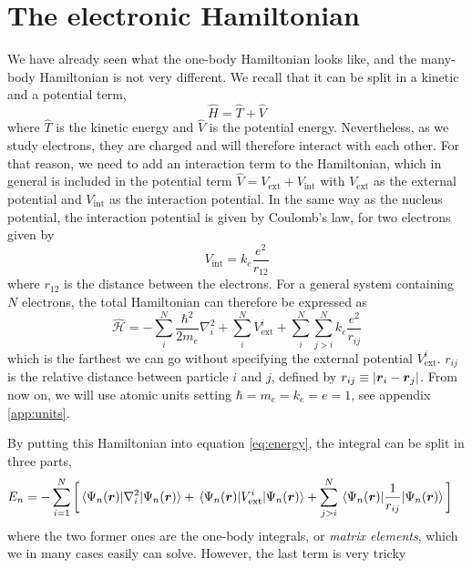 \section{The electronic Hamiltonian} \label{sec:electronichamiltonian}
We have already seen what the one-body Hamiltonian looks like, and the many-body Hamiltonian is not very different. We recall that it can be split in a kinetic and a potential term,
\begin{equation}
\hat{H}=\hat{T}+\hat{V}
\end{equation}
where $\hat{T}$ is the kinetic energy and $\hat{V}$ is the potential energy. Nevertheless, as we study electrons, they are charged and will therefore interact with each other. For that reason, we need to add an interaction term to the Hamiltonian, which in general is included in the potential term $\hat{V}=V_{\text{ext}}+V_{\text{int}}$ with $V_{\text{ext}}$ as the external potential and $V_{\text{int}}$ as the interaction potential. In the same way as the nucleus potential, the interaction potential is given by Coulomb's law, for two electrons given by 
\begin{equation}
V_{\text{int}} =k_e\frac{e^2}{r_{12}}
\end{equation}
where $r_{12}$ is the distance between the electrons. For a general system containing $N$ electrons, the total Hamiltonian can therefore be expressed as 
\begin{equation}
\hat{\mathcal{H}}=-\sum_i^N\frac{\hbar^2}{2m_e}\nabla_i^2+\sum_i^{N}V_{\text{ext}}^i + \sum_i^N\sum_{j>i}^Nk_e\frac{e^2}{r_{ij}}
\label{eq:ElectronicHamiltonian}
\end{equation}
which is the farthest we can go without specifying the external potential $V_{\text{ext}}^i$. $r_{ij}$ is the relative distance between particle $i$ and $j$, defined by $r_{ij}\equiv|\boldsymbol{{r}}_i-\boldsymbol{{r}}_j|$. From now on, we will use atomic units setting $\hbar=m_e=k_e=e=1$, see appendix \ref{app:units}.

By putting this Hamiltonian into equation \eqref{eq:energy}, the integral can be split in three parts,
\begin{equation}
\begin{aligned}
E_n&=-\sum_{i=1}^N\bigg[\mel{\Psi_n(\bs{r})}{\nabla_i^2}{\Psi_n(\bs{r})}
+\mel{\Psi_n(\bs{r})}{V_{\text{ext}}^i}{\Psi_n(\bs{r})}
+\sum_{j>i}^N\mel{\Psi_n(\bs{r})}{\frac{1}{r_{ij}}}{\Psi_n(\bs{r})}\bigg]
\end{aligned}
\end{equation}
where the two former ones are the one-body integrals, or \textit{matrix elements}, which we in many cases easily can solve. However, the last term is very tricky 

